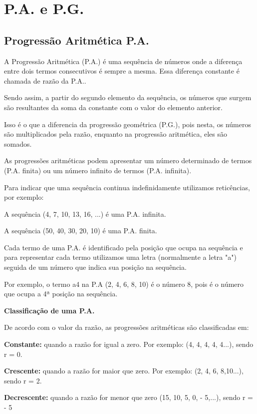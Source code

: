 \begin{multicols*}{2}
\begin{enumerate}[wide, labelwidth=!, labelindent=0pt]
	\end{enumerate}

	\section*{P.A. e P.G.}

	\subsection*{Progressão Aritmética P.A.}

	A Progressão Aritmética (P.A.) é uma sequência de números onde a diferença entre dois termos consecutivos é sempre a mesma. Essa diferença constante é chamada de razão da P.A..

	Sendo assim, a partir do segundo elemento da sequência, os números que surgem são resultantes da soma da constante com o valor do elemento anterior.

	Isso é o que a diferencia da progressão geométrica (P.G.), pois nesta, os números são multiplicados pela razão, enquanto na progressão aritmética, eles são somados.

	As progressões aritméticas podem apresentar um número determinado de termos (P.A. finita) ou um número infinito de termos (P.A. infinita).

	Para indicar que uma sequência continua indefinidamente utilizamos reticências, por exemplo:

	A sequência {(4, 7, 10, 13, 16, ...)} é uma P.A. infinita.

	A sequência {(50, 40, 30, 20, 10)} é uma P.A. finita.

	Cada termo de uma P.A. é identificado pela posição que ocupa na sequência e para representar cada termo utilizamos uma letra (normalmente a letra "a") seguida de um número que indica sua posição na sequência.

	Por exemplo, o termo a4 na P.A (2, 4, 6, 8, 10) é o número 8, pois é o número que ocupa a 4ª posição na sequência.

	\textbf{Classificação de uma P.A.}

	De acordo com o valor da razão, as progressões aritméticas são classificadas em:

	\textbf{Constante:} quando a razão for igual a zero. Por exemplo: {(4, 4, 4, 4, 4...)}, sendo r = 0.

	\textbf{Crescente:} quando a razão for maior que zero. Por exemplo: {(2, 4, 6, 8,10...)}, sendo r = 2.

	\textbf{Decrescente:} quando a razão for menor que zero {(15, 10, 5, 0, - 5,...)}, sendo r = - 5


\end{multicols*}
